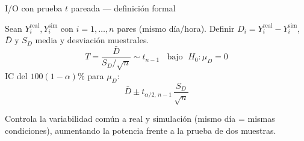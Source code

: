 \documentclass[aspectratio=1610, 10pt]{beamer}
\begin{document}
\begin{frame}{I/O con prueba $t$ pareada — definición formal}
  \begin{formulabox}
    \footnotesize
    Sean $Y_i^{\text{real}}, Y_i^{\text{sim}}$ con $i=1,\ldots,n$ pares
    (mismo día/hora). Definir
    $D_i = Y_i^{\text{real}}-Y_i^{\text{sim}}$, $\bar D$ y $S_D$ media y
    desviación muestrales.
    \[
      T = \frac{\bar D}{S_D/\sqrt{n}} \sim t_{n-1}\;\;\text{ bajo }\;
      H_0:\mu_D=0
    \]
    IC del $100(1-\alpha)\%$ para $\mu_D$:
    \[
      \bar D \pm t_{\alpha/2,\,n-1}\,\frac{S_D}{\sqrt{n}}
    \]
  \end{formulabox}

  \vspace{6pt}
  \begin{notabox}
    \footnotesize
    Controla la variabilidad común a real y simulación (mismo día = mismas
    condiciones), aumentando la potencia frente a la prueba de dos muestras.
  \end{notabox}
\end{frame}
\end{document}
